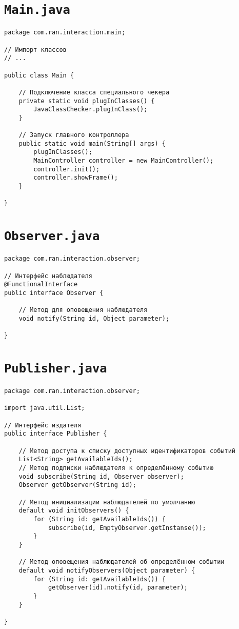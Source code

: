 \section*{\texttt{Main.java}}
\begin{verbatim}
package com.ran.interaction.main;

// Импорт классов
// ...

public class Main {

    // Подключение класса специального чекера
    private static void plugInClasses() {
        JavaClassChecker.plugInClass();
    }

    // Запуск главного контроллера
    public static void main(String[] args) {
        plugInClasses();
        MainController controller = new MainController();
        controller.init();
        controller.showFrame();
    }

}
\end{verbatim}

\section*{\texttt{Observer.java}}
\begin{verbatim}
package com.ran.interaction.observer;

// Интерфейс наблюдателя
@FunctionalInterface
public interface Observer {

    // Метод для оповещения наблюдателя
    void notify(String id, Object parameter);
    
}
\end{verbatim}

\section*{\texttt{Publisher.java}}
\begin{verbatim}
package com.ran.interaction.observer;

import java.util.List;

// Интерфейс издателя
public interface Publisher {

    // Метод доступа к списку доступных идентификаторов событий
    List<String> getAvailableIds();
    // Метод подписки наблюдателя к определённому событию
    void subscribe(String id, Observer observer);
    Observer getObserver(String id);
    
    // Метод инициализации наблюдателей по умолчанию
    default void initObservers() {
        for (String id: getAvailableIds()) {
            subscribe(id, EmptyObserver.getInstanse());
        }
    }
    
    // Метод оповещения наблюдателей об определённом событии
    default void notifyObservers(Object parameter) {
        for (String id: getAvailableIds()) {
            getObserver(id).notify(id, parameter);
        }
    }
    
}
\end{verbatim}

